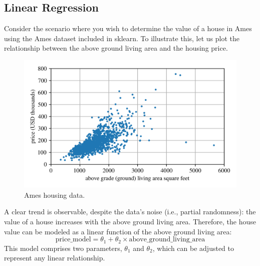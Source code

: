 \documentclass[12pt,letter]{article}
\begin{document}
\pagebreak

\subsection{Linear Regression}
\vspace{-1ex}


Consider the scenario where you wish to determine the value of a house in Ames using the Ames dataset included in sklearn. To illustrate this, let us plot the relationship between the above ground living area and the housing price.

\begin{figure}[H]
    \centering
	\vspace{-1ex}
    \includegraphics[]{../figures/Ames_simple_linear_regression_model_1.png}
	\vspace{-2ex}
    \caption{Ames housing data.}
    \label{fig:Ames_simple_linear_regression_model_1}
\end{figure}

A clear trend is observable, despite the data's noise (i.e., partial randomness): the value of a house increases with the above ground living area. Therefore, the house value can be modeled as a linear function of the above ground living area:
\begin{equation}
\text{price\_model} = \theta_1 + \theta_2 \times \text{above\_ground\_living\_area}
\end{equation}
This model comprises two parameters, $\theta_1$ and $\theta_2$, which can be adjusted to represent any linear relationship.
\end{document}
